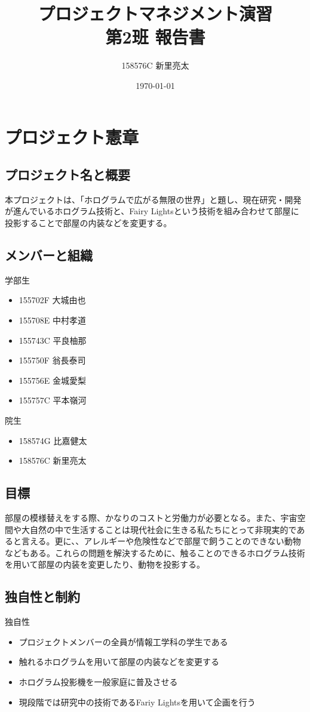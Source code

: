 \documentclass[11pt,a4paper]{jsarticle}
\title{\Huge{プロジェクトマネジメント演習\\第2班 報告書}}
\author{158576C 新里亮太}
\date{\today}
\begin{document}
\maketitle\thispagestyle{empty}
\newpage
\tableofcontents\thispagestyle{empty}
\newpage

\setcounter{page}{1}




\section{プロジェクト憲章}
\subsection{プロジェクト名と概要}


本プロジェクトは、「ホログラムで広がる無限の世界」と題し、現在研究・開発が進んでいるホログラム技術と、Fairy Lightsという技術を組み合わせて部屋に投影することで部屋の内装などを変更する。
\subsection{メンバーと組織}
学部生
\begin{itemize}
\item 155702F 大城由也
\item 155708E 中村孝道
\item 155743C 平良柚那
\item 155750F 翁長泰司
\item 155756E 金城愛梨
\item 155757C 平本嶺河
\end{itemize}

院生
\begin{itemize}
\item 158574G 比嘉健太
\item 158576C 新里亮太  
\end{itemize}


\subsection{目標}
部屋の模様替えをする際、かなりのコストと労働力が必要となる。また、宇宙空間や大自然の中で生活することは現代社会に生きる私たちにとって非現実的であると言える。更に、、アレルギーや危険性などで部屋で飼うことのできない動物などもある。これらの問題を解決するために、触ることのできるホログラム技術を用いて部屋の内装を変更したり、動物を投影する。

\subsection{独自性と制約}
独自性
\begin{itemize}
\item プロジェクトメンバーの全員が情報工学科の学生である
\item 触れるホログラムを用いて部屋の内装などを変更する
\item ホログラム投影機を一般家庭に普及させる
\item 現段階では研究中の技術であるFariy Lightsを用いて企画を行う
\end{itemize}
\end{document}
